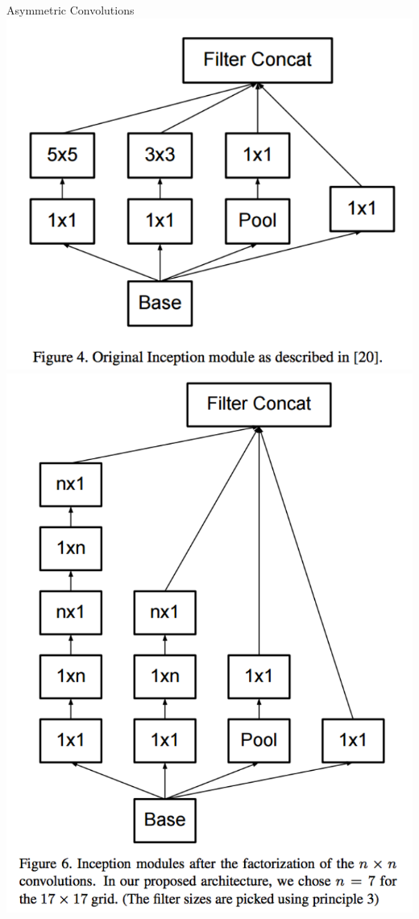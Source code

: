 \documentclass[]{beamer}
\begin{document}
\begin{frame}{Asymmetric Convolutions}
\centering
\includegraphics[scale=0.375]{figures/inception-assymetric-1}
\includegraphics[scale=0.375]{figures/inception-assymetric-2}
\end{frame}
\end{document}
